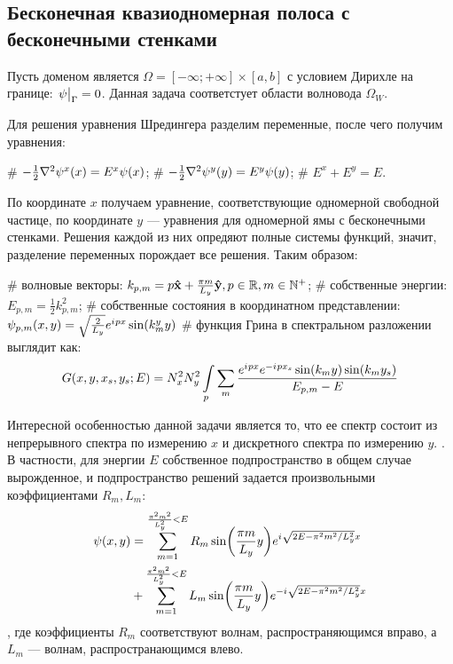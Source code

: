 \subsection{Бесконечная квазиодномерная полоса с бесконечными стенками}
Пусть доменом является $\Omega = [-\infty; +\infty] \times [a, b]$ с условием Дирихле на границе: $\eval{\psi}_{\Gamma} = 0$. Данная задача соответстует области волновода $\Omega_W$.

Для решения уравнения Шредингера разделим переменные, после чего получим уравнения:
\begin{ilist}
# $-\frac{1}{2} \laplacian \psi^x(x) = E^x \psi(x)$;
# $-\frac{1}{2} \laplacian \psi^y(y) = E^y \psi(y)$;
# $E^x + E^y = E$.
\end{ilist}
По координате $x$ получаем уравнение, соответствующие одномерной свободной частице, по координате $y$ — уравнения для одномерной ямы с бесконечными стенками. Решения каждой из них опредяют полные системы функций, значит, разделение переменных порождает все решения. Таким образом:
\begin{ilist}
# волновые векторы: $k_{p, m} = p \vb{\hat{x}} + \frac{\pi m}{L_y} \vb{\hat{y}}, p \in \mathbb{R}, m \in \mathbb{N}^+$;
# собственные энергии: $E_{p, m} = \frac{1}{2} k_{p, m}^2$;
# собственные состояния в координатном представлении: $\psi_{p, m}(x, y) = \sqrt{\frac{2}{L_y}} e^{{i\mkern1mu} p x} \sin(k^y_m y)$
# функция Грина в спектральном разложении выглядит как: 
\[
G(x, y, x_s, y_s; E) = N_x^2 N_y^2 \int\limits_p \sum\limits_m \frac{e^{{i\mkern1mu} p x} e^{-{i\mkern1mu} p x_s} \sin(k_m y) \sin(k_m y_s)}{E_{p, m} - E}
\]
\end{ilist}
Интересной особенностью данной задачи является то, что ее спектр состоит из непрерывного спектра по измерению $x$ и дискретного спектра по измерению $y$. . В частности, для энергии $E$ собственное подпространство в общем случае вырожденное, и подпространство решений задается произвольными коэффициентами $R_m, L_m$:
\begin{align*}
\psi(x, y)
& = \sum\limits_{m = 1}^{\frac{\pi^2 m^2}{L_y^2} < E} R_m \sin(\frac{\pi m}{L_y} y) e^{{i\mkern1mu} \sqrt{2 E - \pi^2 m^2 / L_y^2} x} \\
& + \sum\limits_{m = 1}^{\frac{\pi^2 m^2}{L_y^2} < E} L_m \sin(\frac{\pi m}{L_y} y) e^{-{i\mkern1mu} \sqrt{2 E - \pi^2 m^2 / L_y^2} x}
\end{align*}
, где коэффициенты $R_m$ соответствуют волнам, распространяющимся вправо, а $L_m$ — волнам, распространающимся влево. 


